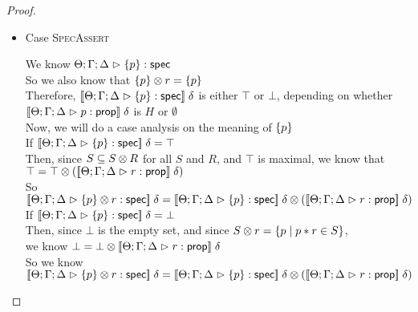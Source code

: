 \begin{proof}
\begin{itemize}
    \item Case \textsc{SpecAssert}
      \begin{tabbedproof}
        \oo We know ${\Theta; \Gamma; \Delta} \vartriangleright {\{{p}\}} : \mathsf{spec}$ \\
        \oo So we also know that ${\{{p}\}} \otimes {r} = \{{p}\}$ \\
        \oo Therefore, $[\![{{\Theta; \Gamma; \Delta} \vartriangleright {\{{p}\}} : \mathsf{spec}}]\!]\;\delta$ is either $\top$ or $\bot$, depending on
            whether $[\![{{\Theta; \Gamma; \Delta} \vartriangleright {p} : {\mathsf{prop}}}]\!]\;\delta$ is $H$ or $\emptyset$ \\
        \oo Now, we will do a case analysis on the meaning of $\{{p}\}$ \\
        \ooo If $[\![{{\Theta; \Gamma; \Delta} \vartriangleright {\{{p}\}} : \mathsf{spec}}]\!]\;\delta = \top$ \\
        \oooo Then, since $S \subseteq {S} \otimes {R}$ for all $S$ and $R$, and $\top$ is maximal, we know that \\
        \oooox $\top = {\top} \otimes {([\![{{\Theta; \Gamma; \Delta} \vartriangleright {r} : {\mathsf{prop}}}]\!]\;\delta)}$ \\
        \oooo So $[\![{{\Theta; \Gamma; \Delta} \vartriangleright {{\{{p}\}} \otimes {r}} : \mathsf{spec}}]\!]\;\delta = {[\![{{\Theta; \Gamma; \Delta} \vartriangleright {\{{p}\}} : \mathsf{spec}}]\!]\;\delta} \otimes {([\![{{\Theta; \Gamma; \Delta} \vartriangleright {r} : {\mathsf{prop}}}]\!]\;\delta)}$ \\
        \ooo If $[\![{{\Theta; \Gamma; \Delta} \vartriangleright {\{{p}\}} : \mathsf{spec}}]\!]\;\delta = \bot$ \\
        \oooo Then, since $\bot$ is the empty set, and since ${S} \otimes {r} = \{{{p}\;|\;{p * r \in S}}\}$, \\
        \ooooo we know $\bot = {\bot} \otimes {[\![{{\Theta; \Gamma; \Delta} \vartriangleright {r} : {\mathsf{prop}}}]\!]\;\delta}$ \\
        \oooo  So we know $[\![{{\Theta; \Gamma; \Delta} \vartriangleright {{\{{p}\}} \otimes {r}} : \mathsf{spec}}]\!]\;\delta = {[\![{{\Theta; \Gamma; \Delta} \vartriangleright {\{{p}\}} : \mathsf{spec}}]\!]\;\delta} \otimes {([\![{{\Theta; \Gamma; \Delta} \vartriangleright {r} : {\mathsf{prop}}}]\!]\;\delta)}$ \\
      \end{tabbedproof}


\end{itemize}
\end{proof}
